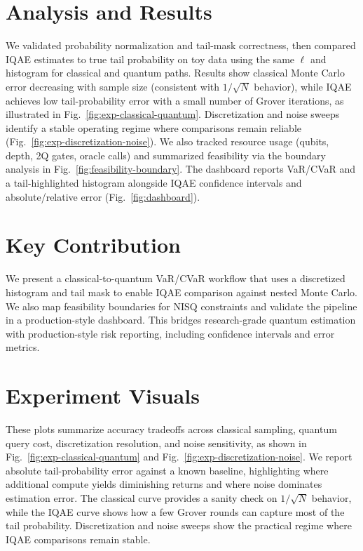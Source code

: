 \documentclass[conference]{IEEEtran}
\begin{document}
\section{Analysis and Results}
We validated probability normalization and tail-mask correctness, then compared IQAE estimates to true tail probability on toy data using the same $\ell$ and histogram for classical and quantum paths. Results show classical Monte Carlo error decreasing with sample size (consistent with $1/\sqrt{N}$ behavior), while IQAE achieves low tail-probability error with a small number of Grover iterations, as illustrated in Fig.~\ref{fig:exp-classical-quantum}. Discretization and noise sweeps identify a stable operating regime where comparisons remain reliable (Fig.~\ref{fig:exp-discretization-noise}). We also tracked resource usage (qubits, depth, 2Q gates, oracle calls) and summarized feasibility via the boundary analysis in Fig.~\ref{fig:feasibility-boundary}. The dashboard reports VaR/CVaR and a tail-highlighted histogram alongside IQAE confidence intervals and absolute/relative error (Fig.~\ref{fig:dashboard}).

\section{Key Contribution}
We present a classical-to-quantum VaR/CVaR workflow that uses a discretized histogram and tail mask to enable IQAE comparison against nested Monte Carlo. We also map feasibility boundaries for NISQ constraints and validate the pipeline in a production-style dashboard. This bridges research-grade quantum estimation with production-style risk reporting, including confidence intervals and error metrics.

\section{Experiment Visuals}
These plots summarize accuracy tradeoffs across classical sampling, quantum query cost, discretization resolution, and noise sensitivity, as shown in Fig.~\ref{fig:exp-classical-quantum} and Fig.~\ref{fig:exp-discretization-noise}. We report absolute tail-probability error against a known baseline, highlighting where additional compute yields diminishing returns and where noise dominates estimation error. The classical curve provides a sanity check on $1/\sqrt{N}$ behavior, while the IQAE curve shows how a few Grover rounds can capture most of the tail probability. Discretization and noise sweeps show the practical regime where IQAE comparisons remain stable.
\end{document}
